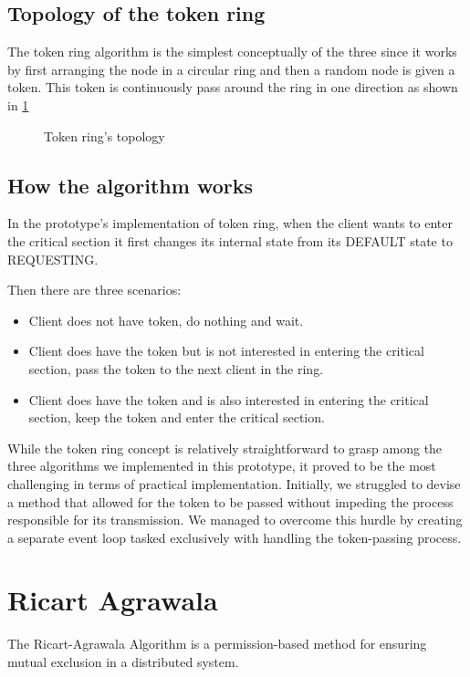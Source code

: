 \subsection{Topology of the token ring}
The token ring algorithm is the simplest conceptually of the three since it works 
by first arranging the node in a circular ring and then a random node is given a 
token. This token is continuously pass around the ring in one direction as shown in
\ref{fig:token_ring_top}

\begin{figure}[htbp]
  \centering
  
  \caption{Token ring's topology}
  \label{fig:token_ring_top}
\end{figure}

\subsection{How the algorithm works}
In the prototype's implementation of token ring, when the client wants to enter 
the critical section it first changes its internal state from its DEFAULT state to 
REQUESTING.

Then there are three scenarios:

\begin{itemize}
  \item Client does not have token, do nothing and wait.
  \item Client does have the token but is not interested in entering the critical section, pass the token to the next client in the ring.
  \item Client does have the token and is also interested in entering the critical section, keep the token and enter the critical section.
\end{itemize}

While the token ring concept is relatively straightforward to grasp among the three algorithms we implemented in this prototype, it proved to be the most challenging in terms of practical implementation. Initially, we struggled to devise a method that allowed for the token to be passed without impeding the process responsible for its transmission. We managed to overcome this hurdle by creating a separate event loop tasked exclusively with handling the token-passing process.

\section{Ricart Agrawala}
The Ricart-Agrawala Algorithm is a permission-based method for ensuring mutual 
exclusion in a distributed system.

